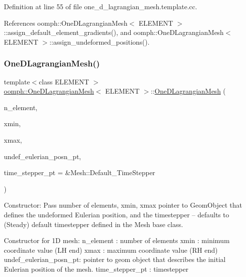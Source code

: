 Definition at line 55 of file one\+\_\+d\+\_\+lagrangian\+\_\+mesh.\+template.\+cc.



References oomph\+::\+One\+D\+Lagrangian\+Mesh$<$ E\+L\+E\+M\+E\+N\+T $>$\+::assign\+\_\+default\+\_\+element\+\_\+gradients(), and oomph\+::\+One\+D\+Lagrangian\+Mesh$<$ E\+L\+E\+M\+E\+N\+T $>$\+::assign\+\_\+undeformed\+\_\+positions().

\mbox{\label{classoomph_1_1OneDLagrangianMesh_a20e1ab05b023f65bea5503938cd70385}} 
\subsubsection{\texorpdfstring{One\+D\+Lagrangian\+Mesh()}{OneDLagrangianMesh()}\hspace{0.1cm}{\footnotesize\ttfamily [2/2]}}
{\footnotesize\ttfamily template$<$class E\+L\+E\+M\+E\+NT $>$ \\
\hyperlink{classoomph_1_1OneDLagrangianMesh}{oomph\+::\+One\+D\+Lagrangian\+Mesh}$<$ E\+L\+E\+M\+E\+NT $>$\+::\hyperlink{classoomph_1_1OneDLagrangianMesh}{One\+D\+Lagrangian\+Mesh} (\begin{DoxyParamCaption}\item[{const unsigned \&}]{n\+\_\+element,  }\item[{const double \&}]{xmin,  }\item[{const double \&}]{xmax,  }\item[{Geom\+Object $\ast$}]{undef\+\_\+eulerian\+\_\+posn\+\_\+pt,  }\item[{Time\+Stepper $\ast$}]{time\+\_\+stepper\+\_\+pt = {\ttfamily \&Mesh\+:\+:Default\+\_\+TimeStepper} }\end{DoxyParamCaption})}



Constructor\+: Pass number of elements, xmin, xmax pointer to Geom\+Object that defines the undeformed Eulerian position, and the timestepper -- defaults to (Steady) default timestepper defined in the Mesh base class. 

Constructor for 1D mesh\+: n\+\_\+element \+: number of elements xmin \+: minimum coordinate value (LH end) xmax \+: maximum coordinate value (RH end) undef\+\_\+eulerian\+\_\+posn\+\_\+pt\+: pointer to geom object that describes the initial Eulerian position of the mesh. time\+\_\+stepper\+\_\+pt \+: timestepper 

